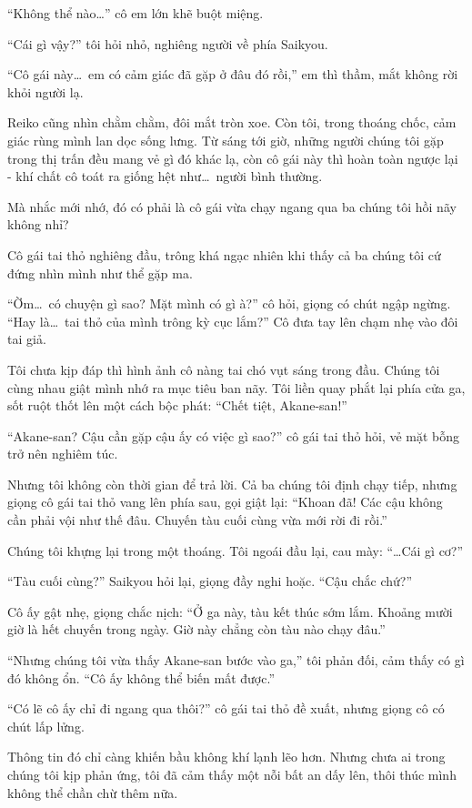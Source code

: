 \documentclass[../main.tex]{subfiles}
\begin{document}
``Không thể nào\dots'' cô em lớn khẽ buột miệng.

``Cái gì vậy?'' tôi hỏi nhỏ, nghiêng người về phía Saikyou.

``Cô gái này\dots\ em có cảm giác đã gặp ở đâu đó rồi,'' em thì thầm, mắt không rời khỏi người lạ.

Reiko cũng nhìn chằm chằm, đôi mắt tròn xoe. Còn tôi, trong thoáng chốc, cảm giác rùng mình lan dọc sống lưng. Từ sáng tới giờ, những người chúng tôi gặp trong thị trấn đều mang vẻ gì đó khác lạ, còn cô gái này thì hoàn toàn ngược lại - khí chất cô toát ra giống hệt như\dots\ người bình thường.

Mà nhắc mới nhớ, đó có phải là cô gái vừa chạy ngang qua ba chúng tôi hồi nãy không nhỉ?

Cô gái tai thỏ nghiêng đầu, trông khá ngạc nhiên khi thấy cả ba chúng tôi cứ đứng nhìn mình như thể gặp ma.

``Ờm\dots\ có chuyện gì sao? Mặt mình có gì à?'' cô hỏi, giọng có chút ngập ngừng. ``Hay là\dots\ tai thỏ của mình trông kỳ cục lắm?'' Cô đưa tay lên chạm nhẹ vào đôi tai giả.

Tôi chưa kịp đáp thì hình ảnh cô nàng tai chó vụt sáng trong đầu. Chúng tôi cùng nhau giật mình nhớ ra mục tiêu ban nãy. Tôi liền quay phắt lại phía cửa ga, sốt ruột thốt lên một cách bộc phát: ``Chết tiệt, Akane-san!''

``Akane-san? Cậu cần gặp cậu ấy có việc gì sao?'' cô gái tai thỏ hỏi, vẻ mặt bỗng trở nên nghiêm túc.

Nhưng tôi không còn thời gian để trả lời. Cả ba chúng tôi định chạy tiếp, nhưng giọng cô gái tai thỏ vang lên phía sau, gọi giật lại: ``Khoan đã! Các cậu không cần phải vội như thế đâu. Chuyến tàu cuối cùng vừa mới rời đi rồi.''

Chúng tôi khựng lại trong một thoáng. Tôi ngoái đầu lại, cau mày: ``\dots Cái gì cơ?''

``Tàu cuối cùng?'' Saikyou hỏi lại, giọng đầy nghi hoặc. ``Cậu chắc chứ?''

Cô ấy gật nhẹ, giọng chắc nịch: ``Ở ga này, tàu kết thúc sớm lắm. Khoảng mười giờ là hết chuyến trong ngày. Giờ này chẳng còn tàu nào chạy đâu.''

``Nhưng chúng tôi vừa thấy Akane-san bước vào ga,'' tôi phản đối, cảm thấy có gì đó không ổn. ``Cô ấy không thể biến mất được.''

``Có lẽ cô ấy chỉ đi ngang qua thôi?'' cô gái tai thỏ đề xuất, nhưng giọng cô có chút lấp lửng.

Thông tin đó chỉ càng khiến bầu không khí lạnh lẽo hơn. Nhưng chưa ai trong chúng tôi kịp phản ứng, tôi đã cảm thấy một nỗi bất an dấy lên, thôi thúc mình không thể chần chừ thêm nữa.
\end{document}
